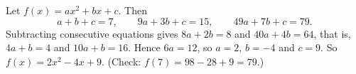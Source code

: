 Let $f(x)=ax^2+bx+c$. Then
\[
a+b+c=7,\qquad 9a+3b+c=15,\qquad 49a+7b+c=79 .
\]
Subtracting consecutive equations gives $8a+2b=8$ and $40a+4b=64$, that is, $4a+b=4$ and $10a+b=16$. Hence $6a=12$, so $a=2$, $b=-4$ and $c=9$. So $\boxed{f(x)=2x^2-4x+9}$. (Check: $f(7)=98-28+9=79$.)
